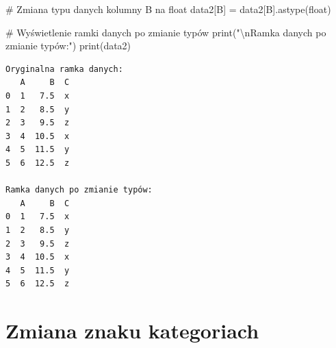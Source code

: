 \documentclass[
  polish,
  letterpaper,
  DIV=11,
  numbers=noendperiod]{scrreprt}
\newenvironment{Shaded}{\begin{snugshade}}{\end{snugshade}}
\newcommand{\BuiltInTok}[1]{\textcolor[rgb]{0.00,0.23,0.31}{#1}}
\newcommand{\CharTok}[1]{\textcolor[rgb]{0.13,0.47,0.30}{#1}}
\newcommand{\CommentTok}[1]{\textcolor[rgb]{0.37,0.37,0.37}{#1}}
\newcommand{\NormalTok}[1]{\textcolor[rgb]{0.00,0.23,0.31}{#1}}
\newcommand{\OperatorTok}[1]{\textcolor[rgb]{0.37,0.37,0.37}{#1}}
\newcommand{\StringTok}[1]{\textcolor[rgb]{0.13,0.47,0.30}{#1}}
\begin{document}
\begin{Shaded}
\begin{Highlighting}[]
\CommentTok{\# Zmiana typu danych kolumny \textquotesingle{}B\textquotesingle{} na float}
\NormalTok{data2[}\StringTok{\textquotesingle{}B\textquotesingle{}}\NormalTok{] }\OperatorTok{=}\NormalTok{ data2[}\StringTok{\textquotesingle{}B\textquotesingle{}}\NormalTok{].astype(}\BuiltInTok{float}\NormalTok{)}

\CommentTok{\# Wyświetlenie ramki danych po zmianie typów}
\BuiltInTok{print}\NormalTok{(}\StringTok{"}\CharTok{\textbackslash{}n}\StringTok{Ramka danych po zmianie typów:"}\NormalTok{)}
\BuiltInTok{print}\NormalTok{(data2)}
\end{Highlighting}
\end{Shaded}

\begin{verbatim}
Oryginalna ramka danych:
   A     B  C
0  1   7.5  x
1  2   8.5  y
2  3   9.5  z
3  4  10.5  x
4  5  11.5  y
5  6  12.5  z

Ramka danych po zmianie typów:
   A     B  C
0  1   7.5  x
1  2   8.5  y
2  3   9.5  z
3  4  10.5  x
4  5  11.5  y
5  6  12.5  z
\end{verbatim}

\section{Zmiana znaku kategoriach}\label{zmiana-znaku-kategoriach}
\end{document}
